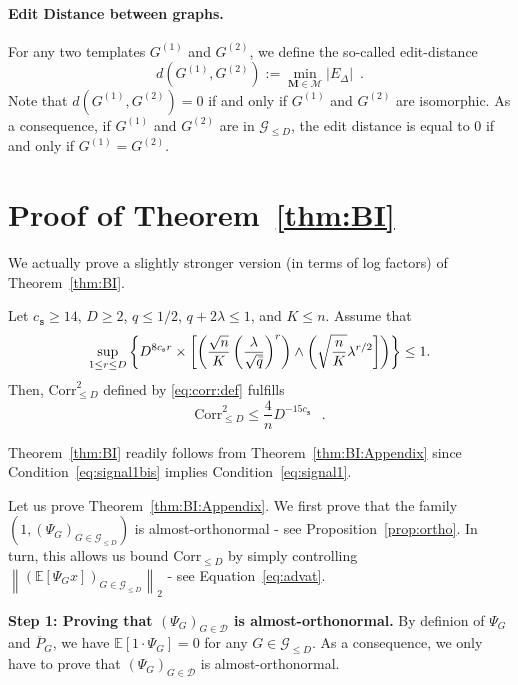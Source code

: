 \documentclass[final]{colt2026}
\newcommand{\1}{\mathbf{1}}
\newcommand{\ac}[1]{\left\{#1\right\}}
\newcommand{\cro}[1]{\left[#1\right]}
\begin{document}
\paragraph{Edit Distance between graphs.} For any two templates $G^{(1)}$ and $G^{(2)}$, we define  the so-called edit-distance
\begin{equation}\label{eq:definition:edit:distance}
d(G^{(1)}, G^{(2)}) := \min_{\mathbf M \in \mathcal M} |E_{\Delta}| \enspace .
\end{equation}
Note that $d(G^{(1)}, G^{(2)})=0$ if and only if $G^{(1)}$ and $G^{(2)}$ are isomorphic. As a consequence, if $G^{(1)}$ and $G^{(2)}$ are in $\mathcal{G}_{\leq D}$, the edit distance is equal to $0$ if and only if $G^{(1)}=G^{(2)}$.




\section{Proof of Theorem~\ref{thm:BI}}\label{sec:proof:BI}
We actually prove a slightly stronger version (in terms of log factors) of Theorem~\ref{thm:BI}.
\begin{theorem}\label{thm:BI:Appendix}
    Let $c_{\texttt{s}}\geq 14$, $D\geq 2$, $q\leq 1/2$, $q+2\lambda \leq 1$, and  $K\leq n$. 
    Assume that 
\begin{align}\label{eq:signal1} 
\sup_{1\leq r\leq D}\ac{ D^{8c_{\texttt{s}}r} \times \cro{\left(\frac{\sqrt{n}}{K} \left(\frac{\lambda}{\sqrt{\bar q}}\right)^{r}\right) \land \left(\sqrt{n\over K}\lambda^{r/2}} \right)}  \leq   1.
\end{align}
Then, $\mathrm{Corr}^2_{\leq D}$ defined by \eqref{eq:corr:def} fulfills
$$\mathrm{Corr}^2_{\leq D} \leq \frac{4}{n}D^{-15 c_{\texttt{s}}}\enspace \ .$$
\end{theorem}

Theorem~\ref{thm:BI} readily follows from Theorem~\ref{thm:BI:Appendix} since Condition~\eqref{eq:signal1bis} implies Condition~\eqref{eq:signal1}.

Let us prove Theorem~\ref{thm:BI:Appendix}.
We first prove that the family $(1,(\Psi_G)_{G\in \mathcal G_{\leq D}})$ is almost-orthonormal - see Proposition~\ref{prop:ortho}. In turn, this allows us bound $\mathrm{Corr}_{\leq D}$ by simply controlling $\left\|(\mathbb E[\Psi_G x])_{G\in \mathcal G_{\leq D}}\right\|_2$ - see Equation~\eqref{eq:advat}. 
\medskip


\noindent
{\bf Step 1: Proving that $(\Psi_G)_{G\in \mathcal D}$ is almost-orthonormal.}
By definion of $\Psi_G$ and $\overline{P}_G$, we have $\mathbb{E}[1\cdot \Psi_G]= 0$ for any $G\in \mathcal{G}_{\leq D}$. As a consequence, we only have to prove that $(\Psi_G)_{G\in \mathcal D}$ is almost-orthonormal.
\end{document}
